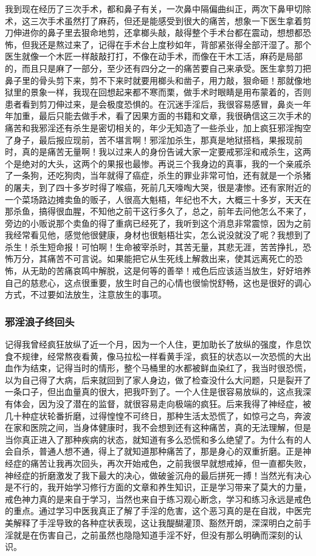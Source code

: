 我到现在经历了三次手术，都和鼻子有关，一次鼻中隔偏曲纠正，两次下鼻甲切除术，这三次手术虽然打了麻药，但还是能感受到很大的痛苦，想象一下医生拿着剪刀伸进你的鼻子里去狠命地剪，还拿榔头敲，敲得整个手术台都在震动，想想都恐怖，但我还是熬过来了，记得在手术台上度秒如年，背部紧张得全部汗湿了。那个医生就像一个木匠一样敲敲打打，不像在动手术，而像在干木工活，麻药是局部的，而且只是麻了一部分，至少还有四分之一的痛苦要自己来承受。医生拿剪刀把鼻子里的骨头剪下来，剪不下来时就要用榔头和凿子，用力敲，狠命砸！那就像地狱里的景象一样，我现在回想起来都不寒而栗，做手术时眼睛是用布蒙着的，否则患者看到剪刀伸过来，是会极度恐惧的。在沉迷手淫后，我很容易感冒，鼻炎一年年加重，最后只能去做手术，看了因果方面的书籍和文章，我很确信这三次手术的痛苦和我邪淫还有杀生是密切相关的，年少无知造了一些杀业，加上疯狂邪淫掏空了身子，最后报应现前，苦不堪言啊！邪淫加杀生，那真是地狱搭档，果报现前时，真的是痛苦无量啊！我以过来人的身份告诫大家一定要戒邪淫和戒杀生，这两个是绝对的大头，这两个的果报也最惨。再说三个我身边的真事，我的一个亲戚杀了一条狗，还吃狗肉，当年就得了癌症，杀生的罪业非常可怕，还有就是一个杀猪的屠夫，到了四十多岁时得了喉癌，死前几天嚎啕大哭，很是凄惨。还有家附近的一个菜场路边摊卖鱼的贩子，人很高大魁梧，年纪也不大，大概三十多岁，天天在那杀鱼，搞得很血腥，不知他之前干这行多久了，总之，前年去问他怎么不来了，旁边的小贩说那个卖鱼的得了重病已经死了，我听到这个消息非常震惊，因为之前我经常看见他，感觉他很健康，身材也很魁梧壮实，怎么说没就没了呢？我想到了杀生！杀生短命报！可怕啊！生命被宰杀时，其苦无量，其悲无涯，苦苦挣扎，恐怖万分，其痛苦不可言说。如果能把它从生死线上解救出来，使其远离死亡的恐怖，从无助的苦痛哀鸣中解脱，这是何等的善举！戒色后应该适当放生，好好培养自己的慈悲心，这点很重要，放生时自己的心情也很愉悦舒畅，这也是很好的调心方式，不过要如法放生，注意放生的事项。

\subsubsection{邪淫浪子终回头}

记得我曾经疯狂放纵了近一个月，因为一个人住，更加助长了放纵的强度，作息饮食不规律，经常熬夜看黄，像马拉松一样看黄手淫，疯狂的状态以一次恐慌的大出血作为结束，记得当时的情形，整个马桶里的水都被鲜血染红了，我当时很恐慌，以为自己得了大病，后来就回到了家人身边，做了检查没什么大问题，只是裂开了一条口子，但出血量真的很大，把我吓到了。一个人住是很容易放纵的，这点我深有体会，因为没了潜在的监督，就很容易走向极端的疯狂。后来我得了神经症，被几十种症状轮番折磨，过得惶惶不可终日，那种生活太恐慌了，如惊弓之鸟，奔波在家和医院之间，当身体健康时，我不会想到还有这种痛苦，真的无法理解，但是当你真正进入了那种疾病的状态，就知道有多么恐慌和多么绝望了。为什么有的人会自杀，普通人想不通，得上了就知道那种痛苦了，那是身心的双重折磨。正是神经症的痛苦让我再次回头，再次开始戒色，之前我很早就想戒掉，但一直都失败，神经症的折磨激发了我下最大的决心，做破釜沉舟的最后拼死一搏！当然光有决心是不行的，我开始学习修行方面的文章和养生知识，正是学习带来了莫大的力量，戒色神力真的是来自于学习，当然也来自于练习观心断念，学习和练习永远是戒色的重点。通过学习中医我真正了解了手淫的危害，这个恶习真的是在自戕，中医完美解释了手淫导致的各种症状表现，这让我醍醐灌顶、豁然开朗，深深明白之前手淫就是在伤害自己，之前虽然也隐隐知道手淫不好，但没有那么明确而深刻的认识。

